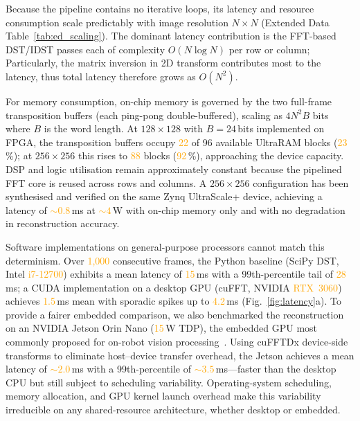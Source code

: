 \documentclass[10pt,a4paper]{article}
\newcommand{\placeholder}[1]{\textcolor{orange}{#1}}
\newcommand{\latPython}{\placeholder{15}}             %
\newcommand{\latCUDA}{\placeholder{1.5}}              %
\begin{document}


Because the pipeline contains no iterative loops, its latency and resource consumption scale predictably with image resolution $N \times N$ (Extended Data Table~\ref{tab:ed_scaling}). The dominant latency contribution is the FFT-based DST/IDST passes each of complexity $O(N \log N)$ per row or column; Particularly, the matrix inversion in 2D transform contributes most to the latency, thus total latency therefore grows as $O(N^2)$. 

For memory consumption, on-chip memory is governed by the two full-frame transposition buffers (each ping-pong double-buffered), scaling as $4 N^2 B$ bits where $B$ is the word length. At $128 \times 128$ with $B = 24$\,bits implemented on FPGA, the transposition buffers occupy \placeholder{22} of 96 available UltraRAM blocks (\placeholder{23}\,\%); at $256 \times 256$ this rises to \placeholder{88} blocks (\placeholder{92}\,\%), approaching the device capacity. DSP and logic utilisation remain approximately constant because the pipelined FFT core is reused across rows and columns. A $256 \times 256$ configuration has been synthesised and verified on the same Zynq UltraScale+ device, achieving a latency of \placeholder{${\sim}0.8$}\,ms at \placeholder{${\sim}4$}\,W with on-chip memory only and with no degradation in reconstruction accuracy.

Software implementations on general-purpose processors cannot match this determinism. Over \placeholder{1{,}000} consecutive frames, the Python baseline (SciPy DST, Intel \placeholder{i7-12700}) exhibits a mean latency of \latPython\,ms with a 99th-percentile tail of \placeholder{28}\,ms; a CUDA implementation on a desktop GPU (cuFFT, NVIDIA \placeholder{RTX~3060}) achieves \latCUDA\,ms mean with sporadic spikes up to \placeholder{4.2}\,ms (Fig.~\ref{fig:latency}a). To provide a fairer embedded comparison, we also benchmarked the reconstruction on an NVIDIA Jetson Orin Nano (\placeholder{15}\,W TDP), the embedded GPU most commonly proposed for on-robot vision processing~\cite{mittal2019jetsonsurvey}. Using cuFFTDx device-side transforms to eliminate host--device transfer overhead, the Jetson achieves a mean latency of \placeholder{${\sim}2.0$}\,ms with a 99th-percentile of \placeholder{${\sim}3.5$}\,ms---faster than the desktop CPU but still subject to scheduling variability. Operating-system scheduling, memory allocation, and GPU kernel launch overhead make this variability irreducible on any shared-resource architecture, whether desktop or embedded.
\end{document}
